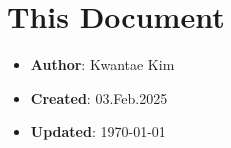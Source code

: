 \documentclass[a4paper,12pt]{article}
\begin{document}
\section{This Document}

\begin{itemize}
    \item \textbf{Author}: Kwantae Kim
    \item \textbf{Created}: 03.Feb.2025
    \item \textbf{Updated}: \today
\end{itemize}


\label{lastpage}
\end{document}
